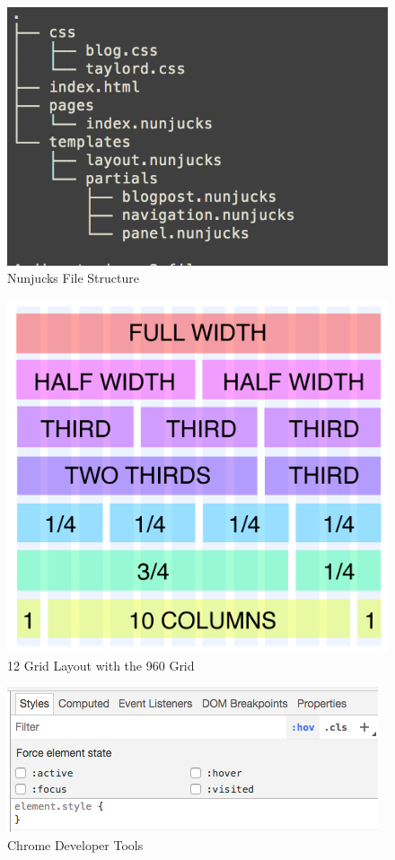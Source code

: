 \newpage
\centering
\begin{figure}[ht]
\includegraphics[scale=0.5]{images/fileStructure}
\caption{Nunjucks File Structure}
  \label{fig:structure}
\end{figure}

\begin{figure}[ht]
\centering
\includegraphics[scale=0.2]{images/960-12-col-grid}
\caption{12 Grid Layout with the 960 Grid}
  \label{fig:grid}
\end{figure}

\begin{figure}[ht]
\centering
\includegraphics[scale=0.5]{images/tools}
\caption{Chrome Developer Tools}
  \label{fig:tools}
\end{figure}


